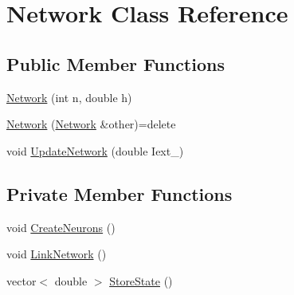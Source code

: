 \hypertarget{classNetwork}{\section{Network Class Reference}
\label{classNetwork}
}
\subsection*{Public Member Functions}
\begin{DoxyCompactItemize}
\item 
\hyperlink{classNetwork_a621f08b0925e54e4ab6d2917f35f7e4d}{Network} (int n, double h)
\item 
\hyperlink{classNetwork_a4be23543c1a08bfcf0ad7954fcb48b97}{Network} (\hyperlink{classNetwork}{Network} \&other)=delete
\item 
void \hyperlink{classNetwork_a1a1f35028ca0e8d1f7a3b619f06b6251}{Update\-Network} (double Iext\-\_\-)
\end{DoxyCompactItemize}
\subsection*{Private Member Functions}
\begin{DoxyCompactItemize}
\item 
void \hyperlink{classNetwork_a95602eab7b45f5884a861e7b98222043}{Create\-Neurons} ()
\item 
void \hyperlink{classNetwork_a04ecdcfaba2309d24e56f787b94a05db}{Link\-Network} ()
\item 
vector$<$ double $>$ \hyperlink{classNetwork_adeab5e8558503586c3d703ed045346de}{Store\-State} ()
\end{DoxyCompactItemize}
